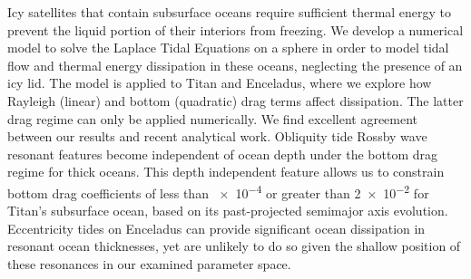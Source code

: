 Icy satellites that contain subsurface oceans require sufficient thermal energy to prevent the liquid portion of their interiors from freezing. We develop a numerical model to solve the Laplace Tidal Equations on a sphere in order to model tidal flow and thermal energy dissipation in these oceans, neglecting the presence of an icy lid. The model is applied to Titan and Enceladus, where we explore how Rayleigh (linear) and bottom (quadratic) drag terms affect dissipation. The latter drag regime can only be applied numerically. We find excellent agreement between our results and recent analytical work. Obliquity tide Rossby wave resonant features become independent of ocean depth under the bottom drag regime for thick oceans. This depth independent feature allows us to constrain bottom drag coefficients of less than \num{e-4} or greater than \num{2e-2} for Titan's subsurface ocean, based on its past-projected semimajor axis evolution. Eccentricity tides on Enceladus can provide significant ocean dissipation in resonant ocean thicknesses, yet are unlikely to do so given the shallow position of these resonances in our examined parameter space.